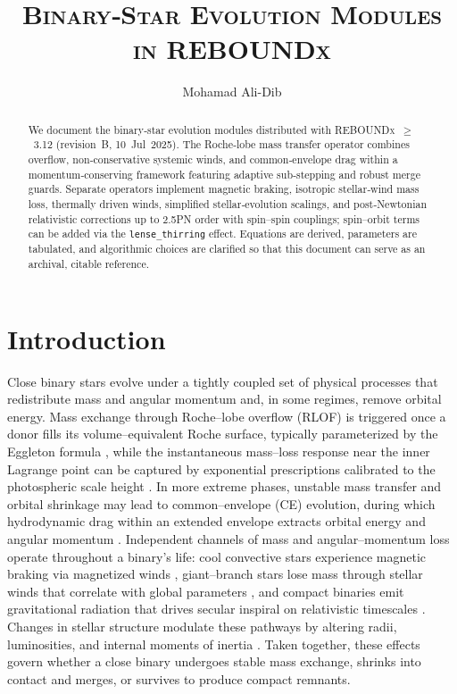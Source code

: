 \documentclass[11pt]{article}
\begin{document}
\title{\textsc{Binary‑Star Evolution Modules in
         \textnormal{REBOUNDx}}}
\author{Mohamad Ali-Dib}
\date{}
\maketitle
\vspace*{-1.5em}

\begin{abstract}
We document the binary‑star evolution modules distributed with
\textsc{REBOUNDx} $\ge$ 3.12 (revision B, 10 Jul 2025).
The Roche‑lobe mass transfer operator combines overflow, non‑conservative
systemic winds, and common‑envelope drag within a momentum‑conserving
framework featuring adaptive sub‑stepping and robust merge guards.
Separate operators implement magnetic braking, isotropic stellar‑wind
mass loss, thermally driven winds, simplified stellar‑evolution scalings,
and post‑Newtonian relativistic corrections up to 2.5PN order with spin--spin couplings; spin--orbit terms can be added via the \texttt{lense\_thirring} effect.  Equations are derived,
parameters are tabulated, and algorithmic
choices are clarified so that this document can serve as an archival,
citable reference.
\end{abstract}



\section{Introduction}\label{sec:intro}
Close binary stars evolve under a tightly coupled set of physical processes that redistribute mass and angular momentum and, in some regimes, remove orbital energy. Mass exchange through Roche–lobe overflow (RLOF) is triggered once a donor fills its volume–equivalent Roche surface, typically parameterized by the Eggleton formula \citep{Eggleton1983}, while the instantaneous mass–loss response near the inner Lagrange point can be captured by exponential prescriptions calibrated to the photospheric scale height \citep{Ritter1988}. In more extreme phases, unstable mass transfer and orbital shrinkage may lead to common–envelope (CE) evolution, during which hydrodynamic drag within an extended envelope extracts orbital energy and angular momentum \citep{Ostriker1999}. Independent channels of mass and angular–momentum loss operate throughout a binary’s life: cool convective stars experience magnetic braking via magnetized winds \citep{Verbunt1981,Kawaler1988}, giant–branch stars lose mass through stellar winds that correlate with global parameters \citep{Reimers1975}, and compact binaries emit gravitational radiation that drives secular inspiral on relativistic timescales \citep{Peters1964}. Changes in stellar structure modulate these pathways by altering radii, luminosities, and internal moments of inertia \citep{Hurley2000}. Taken together, these effects govern whether a close binary undergoes stable mass exchange, shrinks into contact and merges, or survives to produce compact remnants.
\end{document}
